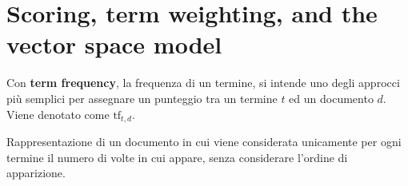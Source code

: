 \documentclass[\main/main.tex]{subfiles}
\begin{document}
\chapter{Scoring, term weighting, and the vector space model}
\begin{multicols}{2}
\begin{definition}
    Con \textbf{term frequency}, la frequenza di un termine, si intende uno degli approcci più semplici per assegnare un punteggio tra un termine \(t\) ed un documento \(d\). Viene denotato come \(\text{tf}_{t,d}\).
\end{definition}
\begin{definition}
    Rappresentazione di un documento in cui viene considerata unicamente per ogni termine il numero di volte in cui appare, senza considerare l'ordine di apparizione. 
    

\end{definition}
\end{multicols}
\end{document}
